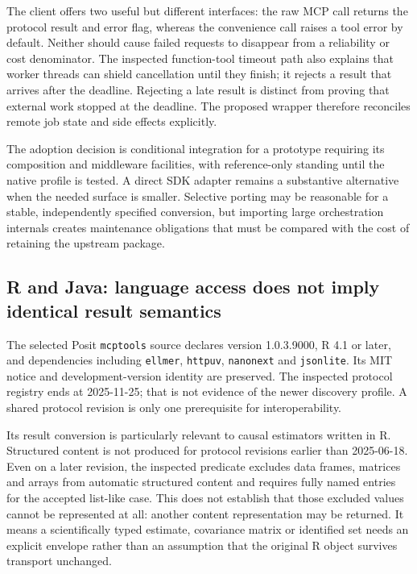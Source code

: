 The client offers two useful but different interfaces: the raw MCP call
returns the protocol result and error flag, whereas the convenience call
raises a tool error by default. Neither should cause failed requests to
disappear from a reliability or cost denominator. The inspected function-tool
timeout path also explains that worker threads can shield cancellation until
they finish; it rejects a result that arrives after the deadline. Rejecting
a late result is distinct from proving that external work stopped at the
deadline. The proposed wrapper therefore reconciles remote job state and
side effects explicitly.~\citep{exec24_mcp_fastmcp}

The adoption decision is conditional integration for a prototype requiring
its composition and middleware facilities, with reference-only standing
until the native profile is tested. A direct SDK adapter remains a substantive
alternative when the needed surface is smaller. Selective porting may be
reasonable for a stable, independently specified conversion, but importing
large orchestration internals creates maintenance obligations that must be
compared with the cost of retaining the upstream package.
\citep{exec24_mcp_contracts}

\subsection{R and Java: language access does not imply identical result semantics}

The selected Posit \texttt{mcptools} source declares version 1.0.3.9000,
R 4.1 or later, and dependencies including \texttt{ellmer}, \texttt{httpuv},
\texttt{nanonext} and \texttt{jsonlite}. Its MIT notice and development-version
identity are preserved. The inspected protocol registry ends at 2025-11-25;
that is not evidence of the newer discovery profile. A shared protocol
revision is only one prerequisite for interoperability.
\citep{exec24_mcp_r}

Its result conversion is particularly relevant to causal estimators written
in R. Structured content is not produced for protocol revisions earlier than
2025-06-18. Even on a later revision, the inspected predicate excludes data
frames, matrices and arrays from automatic structured content and requires
fully named entries for the accepted list-like case. This does not establish
that those excluded values cannot be represented at all: another content
representation may be returned. It means a scientifically typed estimate,
covariance matrix or identified set needs an explicit envelope rather than
an assumption that the original R object survives transport unchanged.
\citep{exec24_mcp_r}


